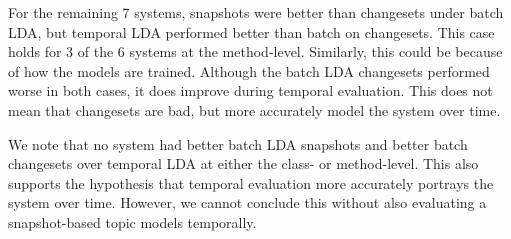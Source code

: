 For the remaining 7 systems, snapshots were better than changesets under batch LDA,
but temporal LDA performed better than batch on changesets.
This case holds for 3 of the 6 systems at the method-level.
Similarly, this could be because of how the models are trained.
Although the batch LDA changesets performed worse in both cases, it does
improve during temporal evaluation.
This does not mean that changesets are bad, but more accurately model
the system over time.

We note that no system had better batch LDA snapshots and better batch changesets over temporal LDA
at either the class- or method-level.
This also supports the hypothesis that temporal evaluation more accurately portrays the system over time.
However, we cannot conclude this without also evaluating a snapshot-based topic models temporally.
